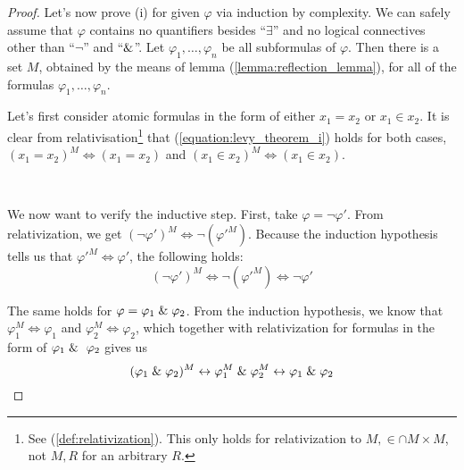 \begin{proof}
Let's now prove (i) for given $\varphi$ via induction by complexity. We can safely assume that $\varphi$ contains no quantifiers besides ``$\exists$'' and no logical connectives other than ``$\neg$'' and ``$\mathrel{\&}$''.
Let $\varphi_1, \ldots, \varphi_n$ be all subformulas of $\varphi$. Then there is a set $M$, obtained by the means of lemma (\ref{lemma:reflection_lemma}), for all of the formulas $\varphi_1, \ldots, \varphi_n$. 

Let's first consider atomic formulas in the form of either $x_1 = x_2$ or $x_1 \in x_2$. %
It is clear from relativisation\footnote{See (\ref{def:relativization}). This only holds for relativization to $M, \in \cap M \times M$, not $M, R$ for an arbitrary $R$.} that (\ref{equation:levy_theorem_i}) holds for both cases, $(x_1 = x_2)^M \iff (x_1 = x_2)$ and $(x_1 \in x_2)^M \iff (x_1 \in x_2)$.

\

We now want to verify the inductive step. First, take $\varphi = \neg \varphi'$. From relativization, we get $(\neg \varphi')^M \iff \neg (\varphi'^M)$.
Because the induction hypothesis tells us that $\varphi'^M \iff \varphi'$, the following holds:
\begin{equation}
(\neg \varphi')^{M} \iff \neg (\varphi'^M) \iff \neg \varphi'
\end{equation}

The same holds for $\varphi = \varphi_1 \mathrel{\&} \varphi_2$. From the induction hypothesis, we know that $\varphi_1^M \iff \varphi_1$ and $\varphi_2^M \iff \varphi_2$, which together with relativization for formulas in the form of $\varphi_1 \et \varphi_2$ gives us
\begin{equation}
(\varphi_1 \mathrel{\&} \varphi_2)^M \leftrightarrow \varphi_1^M \mathrel{\&} \varphi_2^M \leftrightarrow \varphi_1 \mathrel{\&} \varphi_2
\end{equation}


\end{proof}
